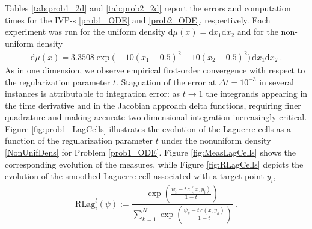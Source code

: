 \documentclass{scrartcl}
\newcommand{\dd}{\mathrm d}
\theoremstyle{plain}
\theoremstyle{definition}
\begin{document}
\renewcommand\theequation{\arabic{equation}} \setcounter{equation}{24}
Tables \ref{tab:prob1_2d} and \ref{tab:prob2_2d} report the errors and computation times for the IVP-s \eqref{prob1_ODE} and \eqref{prob2_ODE}, respectively. Each experiment was run for the uniform density \(\dd\mu(x)=\dd x_1\dd x_2\) and for the non-uniform density
\begin{gather}\label{NonUnifDens}
    \dd\mu(x)=3.3508\exp\bigl(-10(x_1-0.5)^2-10(x_2-0.5)^2\bigr)\,\dd x_1\dd x_2\ .
\end{gather}
As in one dimension, we observe empirical first-order convergence with respect to the regularization parameter \(t\). Stagnation of the error at \(\Delta t=10^{-3}\) in several instances is attributable to integration error: as \(t\to1\) the integrands appearing in the time derivative and in the Jacobian approach delta functions, requiring finer quadrature and making accurate two-dimensional integration increasingly critical. Figure \ref{fig:prob1_LagCells} illustrates the evolution of the Laguerre cells as a function of the regularization parameter $t$ under the nonuniform density \eqref{NonUnifDens} for Problem \eqref{prob1_ODE}. Figure \ref{fig:MeasLagCells} shows the corresponding evolution of the measures, while Figure \ref{fig:RLagCells} depicts the evolution of the smoothed Laguerre cell associated with a target point $y_i$,
\begin{gather*}
    \mathrm{RLag}^t_i(\psi) := \dfrac{\exp\!\left(\frac{\psi_i - t\,c(x,y_i)}{1 - t}\right)}{\sum_{k=1}^N \exp\!\left(\frac{\psi_k - t\,c(x,y_k)}{1 - t}\right)} \ .
\end{gather*}
\end{document}
